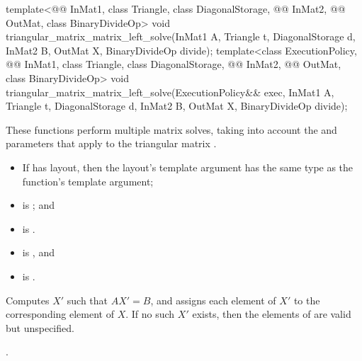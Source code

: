 \begin{itemdecl}
template<@@ InMat1, class Triangle, class DiagonalStorage,
         @@ InMat2, @@ OutMat, class BinaryDivideOp>
  void triangular_matrix_matrix_left_solve(InMat1 A, Triangle t, DiagonalStorage d,
                                           InMat2 B, OutMat X, BinaryDivideOp divide);
template<class ExecutionPolicy,
         @@ InMat1, class Triangle, class DiagonalStorage,
         @@ InMat2, @@ OutMat, class BinaryDivideOp>
  void triangular_matrix_matrix_left_solve(ExecutionPolicy&& exec,
                                           InMat1 A, Triangle t, DiagonalStorage d,
                                           InMat2 B, OutMat X, BinaryDivideOp divide);
\end{itemdecl}

\begin{itemdescr}
\pnum
These functions perform multiple matrix solves,
taking into account the  and  parameters
that apply to the triangular matrix .

\pnum
\mandates
\begin{itemize}
\item
If  has  layout, then the
      layout's  template argument has the same type as
      the function's  template argument;
\item
{}
is ; and
\item
{}
is .
\end{itemize}

\pnum
\expects
\begin{itemize}
\item
{} is , and
\item
{} is .
\end{itemize}

\pnum
\effects
Computes $X'$ such that $AX' = B$,
and assigns each element of $X'$ to the corresponding element of $X$.
If no such $X'$ exists,
then the elements of  are valid but unspecified.

\pnum
\complexity
{}.
\end{itemdescr}

